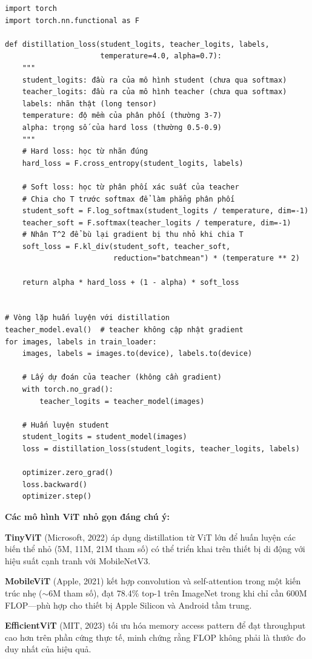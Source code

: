 \begin{verbatim}
import torch
import torch.nn.functional as F

def distillation_loss(student_logits, teacher_logits, labels,
                      temperature=4.0, alpha=0.7):
    """
    student_logits: đầu ra của mô hình student (chưa qua softmax)
    teacher_logits: đầu ra của mô hình teacher (chưa qua softmax)
    labels: nhãn thật (long tensor)
    temperature: độ mềm của phân phối (thường 3-7)
    alpha: trọng số của hard loss (thường 0.5-0.9)
    """
    # Hard loss: học từ nhãn đúng
    hard_loss = F.cross_entropy(student_logits, labels)

    # Soft loss: học từ phân phối xác suất của teacher
    # Chia cho T trước softmax để làm phẳng phân phối
    student_soft = F.log_softmax(student_logits / temperature, dim=-1)
    teacher_soft = F.softmax(teacher_logits / temperature, dim=-1)
    # Nhân T^2 để bù lại gradient bị thu nhỏ khi chia T
    soft_loss = F.kl_div(student_soft, teacher_soft,
                         reduction="batchmean") * (temperature ** 2)

    return alpha * hard_loss + (1 - alpha) * soft_loss


# Vòng lặp huấn luyện với distillation
teacher_model.eval()  # teacher không cập nhật gradient
for images, labels in train_loader:
    images, labels = images.to(device), labels.to(device)

    # Lấy dự đoán của teacher (không cần gradient)
    with torch.no_grad():
        teacher_logits = teacher_model(images)

    # Huấn luyện student
    student_logits = student_model(images)
    loss = distillation_loss(student_logits, teacher_logits, labels)

    optimizer.zero_grad()
    loss.backward()
    optimizer.step()
\end{verbatim}

\begin{mdframed}[style=infobox]
\textbf{Các mô hình ViT nhỏ gọn đáng chú ý:}

\textbf{TinyViT} (Microsoft, 2022) áp dụng distillation từ ViT lớn để huấn luyện các biến thể nhỏ (5M, 11M, 21M tham số) có thể triển khai trên thiết bị di động với hiệu suất cạnh tranh với MobileNetV3.

\textbf{MobileViT} (Apple, 2021) kết hợp convolution và self-attention trong một kiến trúc nhẹ ($\sim$6M tham số), đạt 78.4\% top-1 trên ImageNet trong khi chỉ cần 600M FLOP---phù hợp cho thiết bị Apple Silicon và Android tầm trung.

\textbf{EfficientViT} (MIT, 2023) tối ưu hóa memory access pattern để đạt throughput cao hơn trên phần cứng thực tế, minh chứng rằng FLOP không phải là thước đo duy nhất của hiệu quả.
\end{mdframed}
